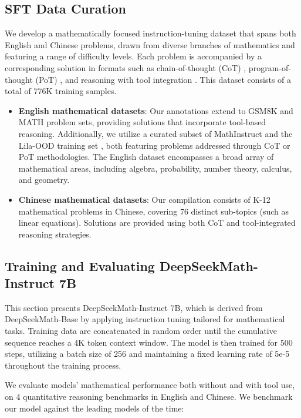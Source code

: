 \begin{itemize}[topsep=0pt]
\subsection{SFT Data Curation}

We develop a mathematically focused instruction-tuning dataset that spans both English and Chinese problems, drawn from diverse branches of mathematics and featuring a range of difficulty levels. Each problem is accompanied by a corresponding solution in formats such as chain-of-thought (CoT) \citep{cot}, program-of-thought (PoT) \citep{pot,pal}, and reasoning with tool integration \citep{tora}. This dataset consists of a total of 776K training samples.

\begin{itemize}[topsep=0pt]
    \item \textbf{English mathematical datasets}: Our annotations extend to GSM8K and MATH problem sets, providing solutions that incorporate tool-based reasoning. Additionally, we utilize a curated subset of MathInstruct \citep{MathInstruct} and the Lila-OOD training set \citep{lila}, both featuring problems addressed through CoT or PoT methodologies. The English dataset encompasses a broad array of mathematical areas, including algebra, probability, number theory, calculus, and geometry.
    \item \textbf{Chinese mathematical datasets}: Our compilation consists of K-12 mathematical problems in Chinese, covering 76 distinct sub-topics (such as linear equations). Solutions are provided using both CoT and tool-integrated reasoning strategies.
\end{itemize}

\subsection{Training and Evaluating DeepSeekMath-Instruct 7B}

This section presents DeepSeekMath-Instruct 7B, which is derived from DeepSeekMath-Base by applying instruction tuning tailored for mathematical tasks. Training data are concatenated in random order until the cumulative sequence reaches a 4K token context window. The model is then trained for 500 steps, utilizing a batch size of 256 and maintaining a fixed learning rate of 5e-5 throughout the training process.

We evaluate models' mathematical performance both without and with tool use, on 4 quantitative reasoning benchmarks in English and Chinese. We benchmark our model against the leading models of the time:


\end{itemize}
